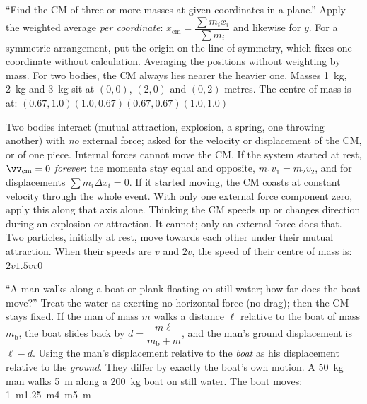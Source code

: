{``Find the CM of three or more masses at given coordinates in a plane.''}
{Apply the weighted average \emph{per coordinate}:
$x_{\text{cm}}=\dfrac{\sum m_ix_i}{\sum m_i}$ and likewise for $y$. For a symmetric arrangement, put the
origin on the line of symmetry, which fixes one coordinate without calculation.}
{Averaging the positions without weighting by mass. For two bodies, the CM always lies nearer the heavier one.}
{Masses \SI{1}{kg}, \SI{2}{kg} and \SI{3}{kg} sit at $(0,0)$, $(2,0)$ and $(0,2)$ metres. The centre of
mass is at:}
{$(0.67,1.0)$}{$(1.0,0.67)$}{$(0.67,0.67)$}{$(1.0,1.0)$}

{Two bodies interact (mutual attraction, explosion, a spring, one throwing another) with \emph{no}
external force; asked for the velocity or displacement of the CM, or of one piece.}
{Internal forces cannot move the CM. If the system started at rest, $\vv_{\text{cm}}=0$ \emph{forever}:
the momenta stay equal and opposite, $m_1v_1=m_2v_2$, and for displacements $\sum m_i\Delta x_i=0$. If it
started moving, the CM coasts at constant velocity through the whole event. With only one external force
component zero, apply this along that axis alone.}
{Thinking the CM speeds up or changes direction during an explosion or attraction. It cannot; only an
external force does that.}
{Two particles, initially at rest, move towards each other under their mutual attraction. When their
speeds are $v$ and $2v$, the speed of their centre of mass is:}
{$2v$}{$1.5v$}{$v$}{$0$}

{``A man walks along a boat or plank floating on still water; how far does the boat move?''}
{Treat the water as exerting no horizontal force (no drag); then the CM stays fixed. If the man of mass $m$ walks a distance $\ell$
relative to the boat of mass $m_{\text{b}}$, the boat slides back by
$\boxed{d=\dfrac{m\ell}{m_{\text{b}}+m}}$, and the man's ground displacement is $\ell-d$.}
{Using the man's displacement relative to the \emph{boat} as his displacement relative to the
\emph{ground}. They differ by exactly the boat's own motion.}
{A \SI{50}{kg} man walks \SI{5}{m} along a \SI{200}{kg} boat on still water. The boat moves:}
{\SI{1}{m}}{\SI{1.25}{m}}{\SI{4}{m}}{\SI{5}{m}}

